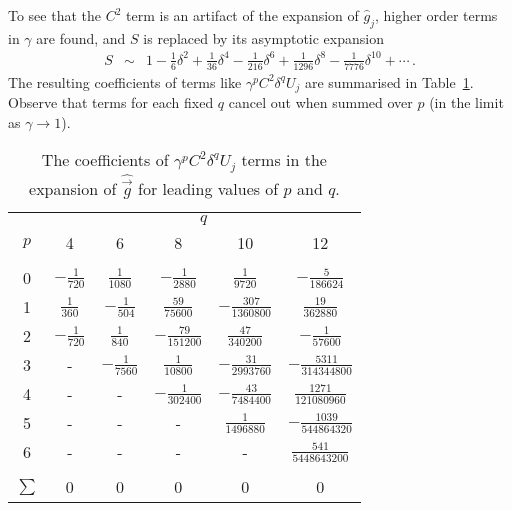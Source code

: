 \documentclass[12pt,a5paper]{article}
\begin{document}
To see that the $C^2$ term is an artifact of the expansion of $\hat{g}_j$, higher order terms in $\gamma$ are found,
and $S$ is replaced by its asymptotic expansion
\begin{eqnarray}
S & \sim & 1-\frac{1}{6}\delta^2+\frac{1}{36}\delta^4-\frac{1}{216}\delta^6+\frac{1}{1296}\delta^8-\frac{1}{7776}\delta^{10}+\cdots\,.
\end{eqnarray}
The resulting coefficients of terms like $\gamma^p C^2\delta^qU_j$ are summarised in Table~\ref{tab:terms}.
Observe that terms for each fixed $q$ cancel out when summed over $p$ (in the limit as $\gamma\rightarrow 1$).
\begin{table}[hbt]
\centering
\begin{tabular}{|c|c|c|c|c|c|}
\hline
& \multicolumn{5}{|c|}{$q$}\\
\cline{2-6}
$p$ & 4 & 6 & 8 & 10 & 12\\
\hline
&&&&&\\[-2ex]
0 & $-\frac{1}{720}$ & $\frac{1}{1080}$ & $-\frac{1}{2880}$ & $\frac{1}{9720}$ & $-\frac{5}{186624}$\\[1ex]
1 & $\frac{1}{360}$ & $-\frac{1}{504}$ & $\frac{59}{75600}$ & $-\frac{307}{1360800}$ & $\frac{19}{362880}$\\[1ex]
2 & $-\frac{1}{720}$ & $\frac{1}{840}$ & $-\frac{79}{151200}$ & $\frac{47}{340200}$ & $-\frac{1}{57600}$\\[1ex]
3 & - & $-\frac{1}{7560}$ & $\frac{1}{10800}$ & $-\frac{31}{2993760}$ & $-\frac{5311}{314344800}$\\[1ex]
4 & - & - & $-\frac{1}{302400}$ & $-\frac{43}{7484400}$ & $\frac{1271}{121080960}$\\[1ex]
5 & - & - & - & $\frac{1}{1496880}$ & $-\frac{1039}{544864320}$\\[1ex]
6 & - & - & - & - & $\frac{541}{5448643200}$\\[1ex]
\hline
&&&&&\\[-2ex]
$\sum$ & 0 & 0 & 0 & 0 & 0\\
\hline
\end{tabular}
\caption{The coefficients of $\gamma^pC^2\delta^q U_j$ terms in the expansion of $\hat{\vec{g}}$ for leading 
values of $p$ and $q$.}
\label{tab:terms}
\end{table}
\end{document}
